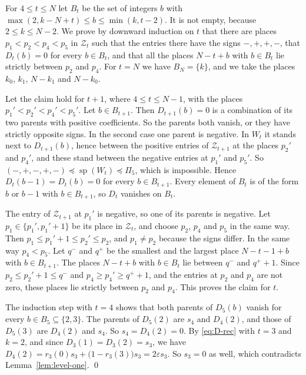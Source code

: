 For $4\le t\le N$ let $B_t$ be the set of integers $b$ with
$\max(2,k-N+t)\le b\le\min(k,t-2)$. It is not empty, because $2\le k\le N-2$.
We prove by downward induction on $t$ that there are places $p_1<p_2<p_4<p_5$
in $\mathcal Z_t$ such that the entries there have the signs $-,+,+,-$, that
$D_t(b)=0$ for every $b\in B_t$, and that all the places $N-t+b$ with
$b\in B_t$ lie strictly between $p_2$ and $p_4$. For $t=N$ we have
$B_N=\{k\}$, and we take the places $k_0$, $k_1$, $N-k_1$ and $N-k_0$.

Let the claim hold for $t+1$, where $4\le t\le N-1$, with the places
$p_1'<p_2'<p_4'<p_5'$. Let $b\in B_{t+1}$. Then $D_{t+1}(b)=0$ is a
combination of its two parents with positive coefficients. So the parents
both vanish, or they have strictly opposite signs. In the second case one
parent is negative. In $W_t$ it stands next to $D_{t+1}(b)$, hence between the
positive entries of $\mathcal Z_{t+1}$ at the places $p_2'$ and $p_4'$, and these stand
between the negative entries at $p_1'$ and $p_5'$. So
$(-,+,-,+,-)\preceq\operatorname{sp}(W_t)\preceq\Pi_5$, which is impossible.
Hence $D_t(b-1)=D_t(b)=0$ for every $b\in B_{t+1}$. Every element of $B_t$ is
of the form $b$ or $b-1$ with $b\in B_{t+1}$, so $D_t$ vanishes on $B_t$.

The entry of $\mathcal Z_{t+1}$ at $p_1'$ is negative, so one of its parents is
negative. Let $p_1\in\{p_1',p_1'+1\}$ be its place in $\mathcal Z_t$, and choose $p_2$,
$p_4$ and $p_5$ in the same way. Then $p_1\le p_1'+1\le p_2'\le p_2$, and
$p_1\ne p_2$ because the signs differ. In the same way $p_4<p_5$. Let $q^-$ and
$q^+$ be the smallest and the largest place $N-t-1+b$ with $b\in B_{t+1}$. The
places $N-t+b$ with $b\in B_t$ lie between $q^-$ and $q^++1$. Since
$p_2\le p_2'+1\le q^-$ and $p_4\ge p_4'\ge q^++1$, and the entries at $p_2$
and $p_4$ are not zero, these places lie strictly between $p_2$ and $p_4$.
This proves the claim for $t$.

The induction step with $t=4$ shows that both parents of $D_5(b)$ vanish for every
$b\in B_5\subseteq\{2,3\}$. The parents of $D_5(2)$ are $s_4$ and $D_4(2)$,
and those of $D_5(3)$ are $D_4(2)$ and $s_4$. So $s_4=D_4(2)=0$. By
\eqref{eq:D-rec} with $t=3$ and $k=2$, and since $D_3(1)=D_3(2)=s_3$, we have
$D_4(2)=r_3(0)s_3+\bigl(1-r_3(3)\bigr)s_3=2\varepsilon s_3$. So $s_3=0$ as
well, which contradicts Lemma~\ref{lem:level-one}. \qed
